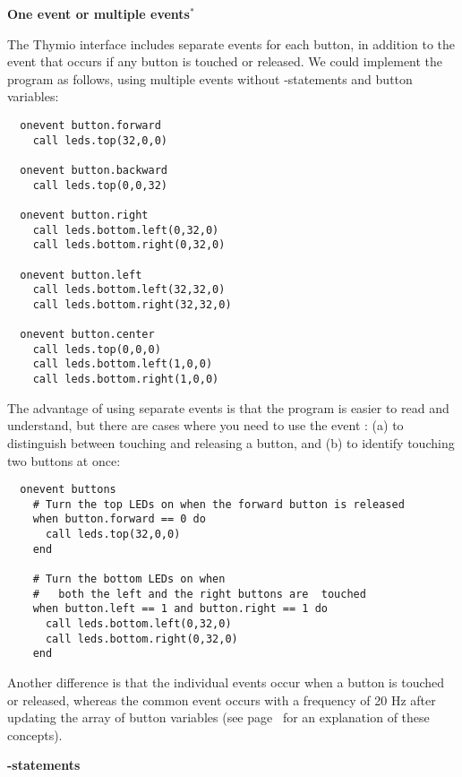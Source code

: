 \textbf{\large One event or multiple events$^*$}

The Thymio interface includes separate events for each button, in
addition to the  event that occurs if any button is touched
or released. We could implement the program as follows, using multiple
events without -statements and button variables:

\begin{footnotesize}
\begin{verbatim}
  onevent button.forward
    call leds.top(32,0,0)
  
  onevent button.backward
    call leds.top(0,0,32)
  
  onevent button.right
    call leds.bottom.left(0,32,0)
    call leds.bottom.right(0,32,0)
  
  onevent button.left
    call leds.bottom.left(32,32,0)
    call leds.bottom.right(32,32,0)
  
  onevent button.center
    call leds.top(0,0,0)
    call leds.bottom.left(1,0,0)
    call leds.bottom.right(1,0,0)
\end{verbatim}
\end{footnotesize}

The advantage of using separate events is that the program is easier to
read and understand, but there are cases where you need to use the event
: (a) to distinguish between touching and releasing a button,
and (b) to identify touching two buttons at once:

\begin{footnotesize}
\begin{verbatim}
  onevent buttons
    # Turn the top LEDs on when the forward button is released
    when button.forward == 0 do
      call leds.top(32,0,0)
    end

    # Turn the bottom LEDs on when
    #   both the left and the right buttons are  touched
    when button.left == 1 and button.right == 1 do
      call leds.bottom.left(0,32,0)
      call leds.bottom.right(0,32,0)
    end
\end{verbatim}
\end{footnotesize}


Another difference is that the individual events occur when a button is
touched or released, whereas the common event  occurs with a
frequency of 20 Hz after updating the array of button variables (see
page~\pageref{pg.hz} for an explanation of these concepts).


\textbf{\large {}-statements}

